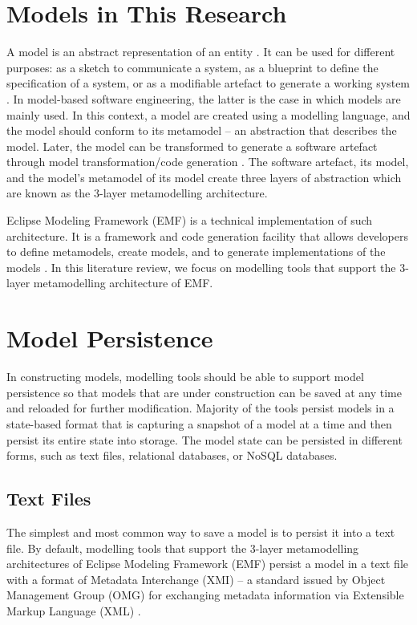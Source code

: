 \section{Models in This Research}
\label{sec:models_in_this_research)}

A model is an abstract representation of an entity \cite{volter2013model}. It can be used for different purposes: as a sketch to communicate a system, as a blueprint to define the specification of a system, or as a modifiable artefact to generate a working system \cite{fowler2019umlmode}. In model-based software engineering, the latter is the case in which models are mainly used. 
In this context, a model are created using a modelling language, and the model should conform to its metamodel -- an abstraction that describes the model. Later, the model can be transformed to generate a software artefact through model transformation/code generation \cite{brambilla2012model}. The software artefact, its model, and the model's metamodel of its model create three layers of abstraction which are known as the 3-layer metamodelling architecture.  

Eclipse Modeling Framework (EMF) \cite{steinberg2008emf} is a technical implementation of such architecture. It is a framework and code generation facility that allows developers to define metamodels, create models, and to generate implementations of the models \cite{steinberg2008emf}. In this literature review, we focus on modelling tools that support the 3-layer metamodelling architecture of EMF.

\section{Model Persistence}
\label{sec:model_persistence}
In constructing models, modelling tools should be able to support model persistence so that models that are under construction can be saved at any time and reloaded for further modification. Majority of the tools persist models in a state-based format that is capturing a snapshot of a model at a time and then persist its entire state into storage. The model state can be persisted in different forms, such as text files, relational databases, or NoSQL databases.

\subsection{Text Files}
\label{sec:text_file}
The simplest and most common way to save a model is to persist it into a text file. By default, modelling tools that support the 3-layer metamodelling architectures of Eclipse Modeling Framework (EMF) \cite{steinberg2008emf} persist a model in a text file with a format of Metadata Interchange (XMI) -- a standard issued by Object Management Group (OMG) for exchanging metadata information via Extensible Markup Language (XML) \cite{omg2018xmi}. 

